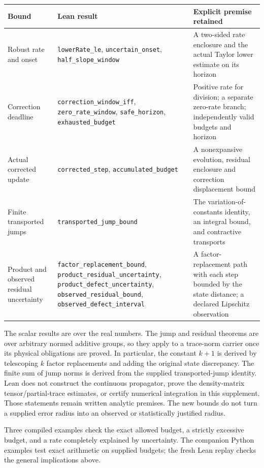 \documentclass[
  11pt,
]{article}
\begin{document}
\begin{longtable}[]{@{}
  >{\raggedright\arraybackslash}p{}
  >{\raggedright\arraybackslash}p{}
  >{\raggedright\arraybackslash}p{}@{}}
\toprule\noalign{}
\begin{minipage}[b]{\linewidth}\raggedright
Bound
\end{minipage} & \begin{minipage}[b]{\linewidth}\raggedright
Lean result
\end{minipage} & \begin{minipage}[b]{\linewidth}\raggedright
Explicit premise retained
\end{minipage} \\
\midrule\noalign{}
\endhead
\bottomrule\noalign{}
\endlastfoot
Robust rate and onset & \texttt{lowerRate\_\allowbreak{}le}, \texttt{uncertain\_\allowbreak{}onset}, \texttt{half\_\allowbreak{}slope\_\allowbreak{}window} & A two-sided rate enclosure and the actual Taylor lower estimate on its horizon \\
Correction deadline & \texttt{correction\_\allowbreak{}window\_\allowbreak{}iff}, \texttt{zero\_\allowbreak{}rate\_\allowbreak{}window}, \texttt{safe\_\allowbreak{}horizon}, \texttt{exhausted\_\allowbreak{}budget} & Positive rate for division; a separate zero-rate branch; independently valid budgets and horizon \\
Actual corrected update & \texttt{corrected\_\allowbreak{}step}, \texttt{accumulated\_\allowbreak{}budget} & A nonexpansive evolution, residual enclosure and correction displacement bound \\
Finite transported jumps & \texttt{transported\_\allowbreak{}jump\_\allowbreak{}bound} & The variation-of-constants identity, an integral bound, and contractive transports \\
Product and observed residual uncertainty & \texttt{factor\_\allowbreak{}replacement\_\allowbreak{}bound}, \texttt{product\_\allowbreak{}residual\_\allowbreak{}uncertainty}, \texttt{product\_\allowbreak{}defect\_\allowbreak{}uncertainty}, \texttt{observed\_\allowbreak{}residual\_\allowbreak{}bound}, \texttt{observed\_\allowbreak{}defect\_\allowbreak{}interval} & A factor-replacement path with each step bounded by the state distance; a declared Lipschitz observation \\
\end{longtable}

The scalar results are over the real numbers. The jump and residual theorems
are over arbitrary normed additive groups, so they apply to a trace-norm
carrier once its physical obligations are proved. In particular, the constant
\(k+1\) is derived by telescoping \(k\) factor replacements and adding the original
state discrepancy. The finite sum of jump norms is derived from the supplied
transported-jump identity. Lean does not construct the continuous propagator,
prove the density-matrix tensor/partial-trace estimates, or certify numerical
integration in this supplement. Those statements remain written analytic
premises. The new bounds do not turn a supplied error radius into an observed
or statistically justified radius.

Three compiled examples check the exact allowed budget, a strictly excessive
budget, and a rate completely explained by uncertainty. The companion Python
examples test exact arithmetic on supplied budgets; the fresh Lean replay
checks the general implications above.
\end{document}
